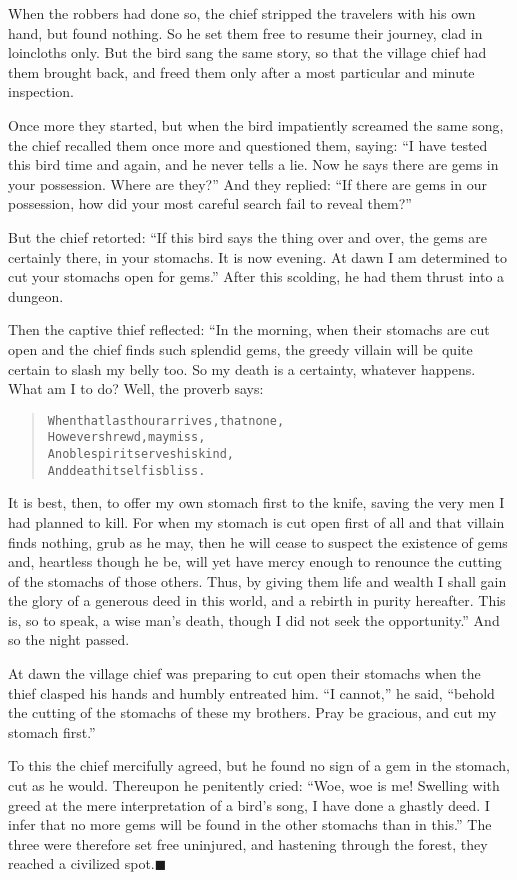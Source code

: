 \documentclass[article, twoside, 14pt]{memoir}
\newcommand{\qed}{\hfill \ensuremath{\blacksquare}}
\renewenvironment{verbatim}{%
\begin{quote}%
\vskip -10pt%
\begin{alltt}\normalfont\large}{\end{alltt}%
\end{quote}%
\vskip -10pt
} %
\begin{document}
When the robbers had done so, the chief stripped the travelers with
his own hand, but found nothing. So he set them free to resume
their journey, clad in loincloths only. But the bird sang the same
story, so that the village chief had them brought back, and freed
them only after a most particular and minute inspection.

Once more they started, but when the bird impatiently screamed the
same song, the chief recalled them once more and questioned them,
saying:
``I have tested this bird time and again, and he never tells a lie. Now he says there are gems in your possession. Where are they?''
And they replied:
``If there are gems in our possession, how did your most careful search fail to reveal them?''

But the chief retorted:
``If this bird says the thing over and over, the gems are certainly there, in your stomachs. It is now evening. At dawn I am determined to cut your stomachs open for gems.''
After this scolding, he had them thrust into a dungeon.

Then the captive thief reflected: “In the morning, when their
stomachs are cut open and the chief finds such splendid gems, the
greedy villain will be quite certain to slash my belly too. So my
death is a certainty, whatever happens. What am I to do? Well, the
proverb says:

\begin{verbatim}
When that last hour arrives, that none,
    However shrewd, may miss,
A noble spirit serves his kind,
    And death itself is bliss.
\end{verbatim}
It is best, then, to offer my own stomach first to the knife,
saving the very men I had planned to kill. For when my stomach is
cut open first of all and that villain finds nothing, grub as he
may, then he will cease to suspect the existence of gems and,
heartless though he be, will yet have mercy enough to renounce the
cutting of the stomachs of those others. Thus, by giving them life
and wealth I shall gain the glory of a generous deed in this world,
and a rebirth in purity hereafter. This is, so to speak, a wise
man's death, though I did not seek the opportunity.” And so the
night passed.

At dawn the village chief was preparing to cut open their stomachs
when the thief clasped his hands and humbly entreated him.
``I cannot,'' he said,
``behold the cutting of the stomachs of these my brothers. Pray be gracious, and cut my stomach first.''

To this the chief mercifully agreed, but he found no sign of a gem
in the stomach, cut as he would. Thereupon he penitently cried:
``Woe, woe is me! Swelling with greed at the mere interpretation of a bird's song, I have done a ghastly deed. I infer that no more gems will be found in the other stomachs than in this.''
The three were therefore set free uninjured, and hastening through
the forest, they reached a civilized spot.\hyperref[s33]{\qed}
\end{document}
